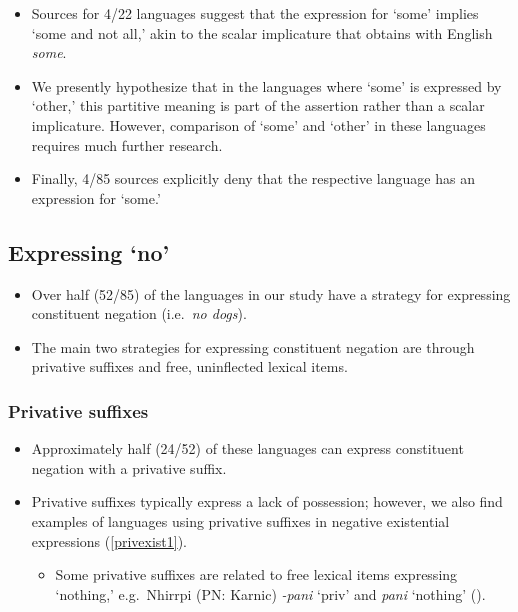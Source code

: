 \documentclass{article}
\makeatletter
\newcommand{\ofy}{/85} %
\makeatother
\begin{document}
\begin{itemize}
\item Sources for 4/22 languages suggest that the expression for `some' implies `some and not all,' akin to the scalar implicature that obtains with English {\it some}.
\item We presently hypothesize that in the languages where `some' is expressed by `other,' this partitive meaning is part of the assertion rather than a scalar implicature. However, comparison of `some' and `other' in these languages requires much further research.
\item Finally, 4\ofy{} sources explicitly deny that the respective language has an expression for `some.'
\end{itemize}



\subsection{Expressing `no'}

\begin{itemize}
    \item Over half (52\ofy) of the languages in our study have a strategy for expressing constituent negation (i.e.\ {\it no dogs}).
    \item The main two strategies for expressing constituent negation are through privative suffixes and free, uninflected lexical items.
\end{itemize}

\subsubsection{Privative suffixes}

\begin{itemize}
    \item Approximately half (24/52)  of these languages can express constituent negation with a privative suffix.
    \item Privative suffixes typically express a lack of possession; however, we also find examples of languages using privative suffixes in negative existential expressions (\ref{privexist1}).
    \begin{itemize}
        \item Some privative suffixes are related to free lexical items expressing `nothing,' e.g.\ Nhirrpi (PN: Karnic) \textit{-pani} `{\sc priv}' and \textit{pani} `nothing' (\citealt{bw05}).
    \end{itemize}
\end{itemize}
\end{document}
